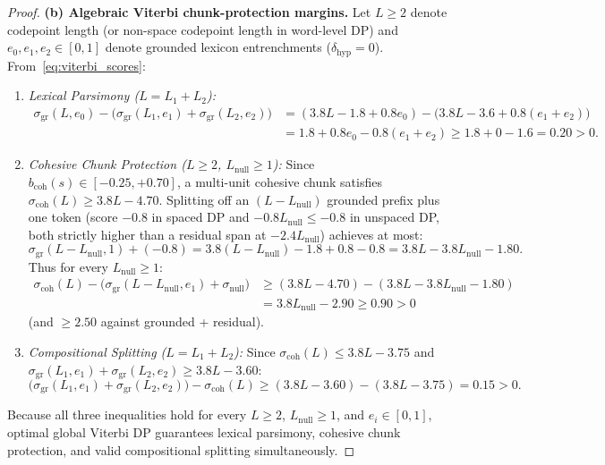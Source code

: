 \begin{proof}
\textbf{(b) Algebraic Viterbi chunk-protection margins.}
Let $L \ge 2$ denote codepoint length (or non-space codepoint length in word-level DP) and $e_0, e_1, e_2 \in [0, 1]$ denote grounded lexicon entrenchments ($\delta_{\mathrm{hyp}} = 0$). From~\eqref{eq:viterbi_scores}:
\begin{enumerate}
  \item \emph{Lexical Parsimony ($L = L_1 + L_2$):}
  \begin{align*}
    \sigma_{\mathrm{gr}}(L, e_0) - \big(\sigma_{\mathrm{gr}}(L_1, e_1) + \sigma_{\mathrm{gr}}(L_2, e_2)\big)
      &= (3.8 L - 1.8 + 0.8 e_0) - \big(3.8 L - 3.6 + 0.8(e_1 + e_2)\big)\\
      &= 1.8 + 0.8 e_0 - 0.8(e_1 + e_2) \ge 1.8 + 0 - 1.6 = 0.20 > 0.
  \end{align*}
  \item \emph{Cohesive Chunk Protection ($L \ge 2$, $L_{\mathrm{null}} \ge 1$):} Since $b_{\mathrm{coh}}(s) \in [-0.25, +0.70]$, a multi-unit cohesive chunk satisfies $\sigma_{\mathrm{coh}}(L) \ge 3.8 L - 4.70$. Splitting off an $(L - L_{\mathrm{null}})$ grounded prefix plus one \NULLTOK{} token (score $-0.8$ in spaced DP and $-0.8 L_{\mathrm{null}} \le -0.8$ in unspaced DP, both strictly higher than a residual span at $-2.4 L_{\mathrm{null}}$) achieves at most:
  \[
    \sigma_{\mathrm{gr}}(L - L_{\mathrm{null}}, 1) + (-0.8) = 3.8(L - L_{\mathrm{null}}) - 1.8 + 0.8 - 0.8 = 3.8 L - 3.8 L_{\mathrm{null}} - 1.80.
  \]
  Thus for every $L_{\mathrm{null}} \ge 1$:
  \begin{align*}
    \sigma_{\mathrm{coh}}(L) - \big(\sigma_{\mathrm{gr}}(L - L_{\mathrm{null}}, e_1) + \sigma_{\mathrm{null}}\big)
      &\ge (3.8 L - 4.70) - (3.8 L - 3.8 L_{\mathrm{null}} - 1.80)\\
      &= 3.8 L_{\mathrm{null}} - 2.90 \ge 0.90 > 0
  \end{align*}
  (and $\ge 2.50$ against grounded + residual).
  \item \emph{Compositional Splitting ($L = L_1 + L_2$):} Since $\sigma_{\mathrm{coh}}(L) \le 3.8 L - 3.75$ and $\sigma_{\mathrm{gr}}(L_1, e_1) + \sigma_{\mathrm{gr}}(L_2, e_2) \ge 3.8 L - 3.60$:
  \[
    \big(\sigma_{\mathrm{gr}}(L_1, e_1) + \sigma_{\mathrm{gr}}(L_2, e_2)\big) - \sigma_{\mathrm{coh}}(L) \ge (3.8 L - 3.60) - (3.8 L - 3.75) = 0.15 > 0.
  \]
\end{enumerate}
Because all three inequalities hold for every $L \ge 2$, $L_{\mathrm{null}} \ge 1$, and $e_i \in [0, 1]$, optimal global Viterbi DP guarantees lexical parsimony, cohesive chunk protection, and valid compositional splitting simultaneously.
\end{proof}

